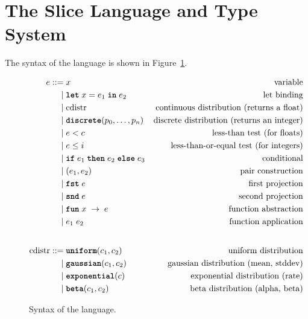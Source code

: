 \documentclass[acmsmall,screen,dvipsnames,x11names,nonacm,anonymous,review]{acmart}
\newcommand{\letkw}{\text{\ttfamily\bfseries let}}
\newcommand{\inkw}{\text{\ttfamily\bfseries in}}
\newcommand{\ifkw}{\text{\ttfamily\bfseries if}}
\newcommand{\thenkw}{\text{\ttfamily\bfseries then}}
\newcommand{\elsekw}{\text{\ttfamily\bfseries else}}
\newcommand{\uniform}{\text{\ttfamily\bfseries uniform}}
\newcommand{\discrete}{\text{\ttfamily\bfseries discrete}}
\newcommand{\gaussian}{\text{\ttfamily\bfseries gaussian}}
\newcommand{\exponential}{\text{\ttfamily\bfseries exponential}}
\newcommand{\betafn}{\text{\ttfamily\bfseries beta}} %
\newcommand{\fstkw}{\text{\ttfamily\bfseries fst}}
\newcommand{\sndkw}{\text{\ttfamily\bfseries snd}}
\newcommand{\funkw}{\text{\ttfamily\bfseries fun}}
\newcommand{\Slice}{\text{\scshape Slice}\xspace}
\begin{document}





\section{The Slice Language and Type System}\label{sec:language}

The syntax of the \Slice language is shown in Figure~\ref{fig:grammar}.

\begin{figure}[h]
\begin{align*}
e ::= &\; x                               & \text{variable} \\
    | &\; \letkw \; x = e_1\; \inkw \; e_2  & \text{let binding} \\
    | &\; \text{cdistr}                   & \text{continuous distribution (returns a float)} \\
    | &\; \discrete(p_0, \ldots, p_{n})      & \text{discrete distribution (returns an integer)} \\
    | &\; e < c                           & \text{less-than test (for floats)} \\
    | &\; e \leq i                           & \text{less-than-or-equal test (for integers)} \\
    | &\; \ifkw \; e_1\; \thenkw \; e_2\; \elsekw \; e_3 & \text{conditional} \\
    | &\; (e_1, e_2)                      & \text{pair construction} \\
    | &\; \fstkw \; e                       & \text{first projection} \\
    | &\; \sndkw \; e                       & \text{second projection} \\
    | &\; \funkw \; x \; \rightarrow \; e    & \text{function abstraction} \\
    | &\; e_1 \; e_2                      & \text{function application} \\
    \\[1ex] %
\text{cdistr} ::= &\; \uniform(c_1, c_2)      & \text{uniform distribution} \\
           | &\; \gaussian(c_1, c_2)   & \text{gaussian distribution (mean, stddev)} \\
           | &\; \exponential(c)      & \text{exponential distribution (rate)} \\
           | &\; \betafn(c_1, c_2)      & \text{beta distribution (alpha, beta)}
\end{align*}
\caption{Syntax of the \Slice language.}
\label{fig:grammar}
\end{figure}
\end{document}
